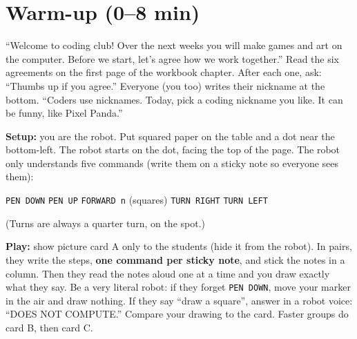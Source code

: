 \section{Warm-up (0--8 min)}
\begin{teacherscript}
\enquote{Welcome to coding club! Over the next weeks you will make games and art on the computer. Before we start, let's agree how we work together.} Read the six agreements on the first page of the workbook chapter. After each one, ask: \enquote{Thumbs up if you agree.} Everyone (you too) writes their nickname at the bottom. \enquote{Coders use nicknames. Today, pick a coding nickname you like. It can be funny, like Pixel Panda.}
\end{teacherscript}

\begin{unplugged}
\textbf{Setup:} you are the robot. Put squared paper on the table and a dot near the bottom-left. The robot starts on the dot, facing the top of the page. The robot only understands five commands (write them on a sticky note so everyone sees them):
\begin{center}
\texttt{PEN DOWN} \quad \texttt{PEN UP} \quad \texttt{FORWARD n} (squares) \quad \texttt{TURN RIGHT} \quad \texttt{TURN LEFT}
\end{center}
(Turns are always a quarter turn, on the spot.)

\textbf{Play:} show picture card A only to the students (hide it from the robot). In pairs, they write the steps, \textbf{one command per sticky note}, and stick the notes in a column. Then they read the notes aloud one at a time and you draw exactly what they say. Be a very literal robot: if they forget \texttt{PEN DOWN}, move your marker in the air and draw nothing. If they say \enquote{draw a square}, answer in a robot voice: \enquote{DOES NOT COMPUTE.} Compare your drawing to the card. Faster groups do card B, then card C.
\end{unplugged}

